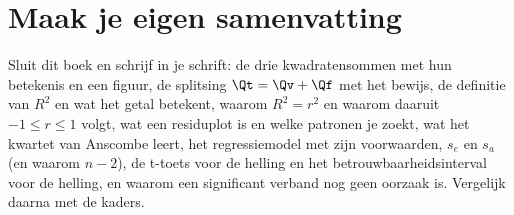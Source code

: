 

\begin{oefeningen}


\end{oefeningen}


\begin{oefeningen}






\end{oefeningen}


\ifzelfstudie
\section*{Maak je eigen samenvatting}
Sluit dit boek en schrijf in je schrift: de drie kwadratensommen met hun betekenis en een figuur, de splitsing $\Qt = \Qv + \Qf$ met het bewijs, de definitie van $R^2$ en wat het getal betekent, waarom $R^2 = r^2$ en waarom daaruit $-1 \leqslant r \leqslant 1$ volgt, wat een residuplot is en welke patronen je zoekt, wat het kwartet van Anscombe leert, het regressiemodel met zijn voorwaarden, $s_e$ en $s_a$ (en waarom $n - 2$), de t-toets voor de helling en het betrouwbaarheidsinterval voor de helling, en waarom een significant verband nog geen oorzaak is. Vergelijk daarna met de kaders.
\fi
